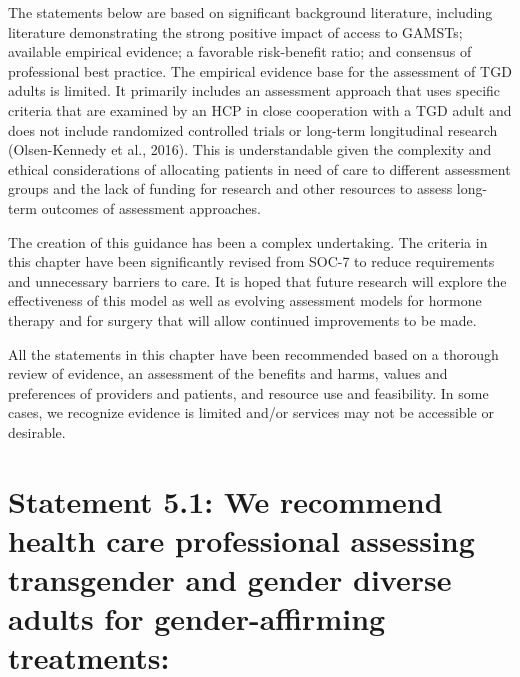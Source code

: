 \documentclass[
]{book}
\begin{document}
The statements below are based on significant
background literature, including literature demonstrating the strong positive impact of access to
GAMSTs; available empirical evidence; a favorable
risk-benefit ratio; and consensus of professional
best practice. The empirical evidence base for the
assessment of TGD adults is limited. It primarily
includes an assessment approach that uses specific criteria that are examined by an HCP in
close cooperation with a TGD adult and does
not include randomized controlled trials or
long-term longitudinal research (Olsen-Kennedy
et al., 2016). This is understandable given the
complexity and ethical considerations of allocating patients in need of care to different assessment groups and the lack of funding for research
and other resources to assess long-term outcomes
of assessment approaches.

The creation of this guidance has been a complex
undertaking. The criteria in this chapter have been
significantly revised from SOC-7 to reduce requirements and unnecessary barriers to care. It is hoped
that future research will explore the effectiveness
of this model as well as evolving assessment models
for hormone therapy and for surgery that will allow
continued improvements to be made.

All the statements in this chapter have been
recommended based on a thorough review of
evidence, an assessment of the benefits and
harms, values and preferences of providers and
patients, and resource use and feasibility. In some
cases, we recognize evidence is limited and/or
services may not be accessible or desirable.

\hypertarget{statement-5.1-we-recommend-health-care-professional-assessing-transgender-and-gender-diverse-adults-for-gender-affirming-treatments}{%
\section*{Statement 5.1: We recommend health care professional assessing transgender and gender diverse adults for gender-affirming treatments:}\label{statement-5.1-we-recommend-health-care-professional-assessing-transgender-and-gender-diverse-adults-for-gender-affirming-treatments}}
\end{document}
